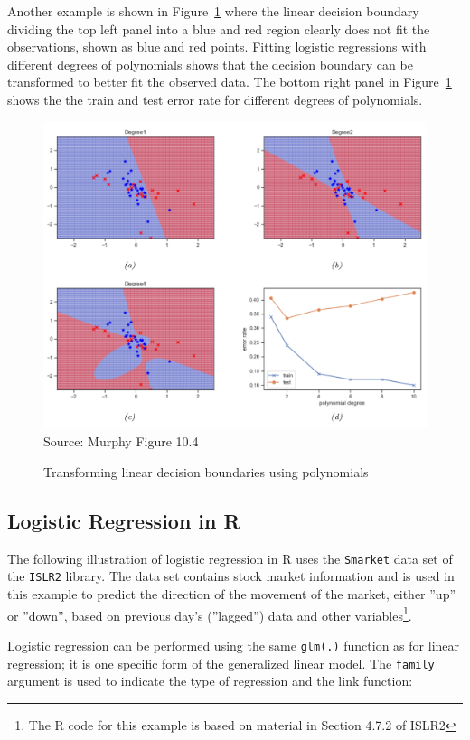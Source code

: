 Another example is shown in Figure~\ref{fig:nonlinearboundary2} where the linear decision boundary dividing the top left panel into a blue and red region clearly does not fit the observations, shown as blue and red points. Fitting logistic regressions with different degrees of polynomials shows that the decision boundary can be transformed to better fit the observed data. The bottom right panel in Figure~\ref{fig:nonlinearboundary2} shows the the train and test error rate for different degrees of polynomials. 

\begin{figure}
\centering
\includegraphics[width=.8\textwidth]{screen3.png} \\
\scriptsize Source: Murphy Figure 10.4
\caption{Transforming linear decision boundaries using polynomials}
\label{fig:nonlinearboundary2}
\end{figure}

\subsection{Logistic Regression in R}

The following illustration of logistic regression in R uses the \texttt{Smarket} data set of the \texttt{ISLR2} library. The data set contains stock market information and is used in this example to predict the direction of the movement of the market, either ''up'' or ''down'', based on previous day's (''lagged'') data and other variables\footnote{The R code for this example is based on material in Section 4.7.2 of ISLR2}. 

Logistic regression can be performed using the same \texttt{glm(.)} function as for linear regression; it is one specific form of the generalized linear model. The \texttt{family} argument is used to indicate the type of regression and the link function:

